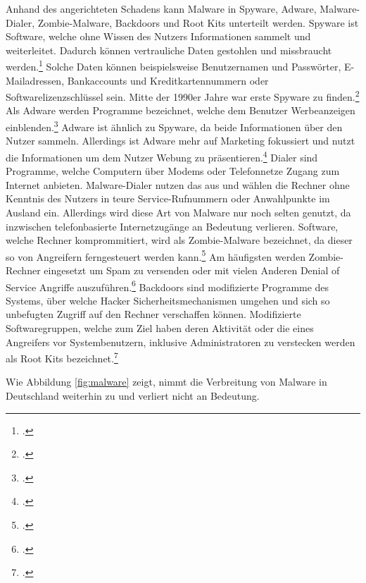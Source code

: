 Anhand des angerichteten Schadens kann Malware in Spyware, Adware, Malware-Dialer, Zombie-Malware,
Backdoors und Root Kits unterteilt werden. Spyware ist Software, welche ohne Wissen des Nutzers
Informationen sammelt und weiterleitet. Dadurch können vertrauliche Daten gestohlen und missbraucht
werden.\footcite[Vgl.][95\psq]{netzwerkDatensicherheit} Solche Daten können beispielsweise
Benutzernamen und Passwörter, E-Mailadressen, Bankaccounts und Kreditkartennummern oder
Softwarelizenzschlüssel sein. Mitte der 1990er Jahre war erste Spyware zu
finden.\footcite[Vgl.][16]{virusesMalware} Als Adware werden Programme bezeichnet, welche dem
Benutzer Werbeanzeigen einblenden.\footcite[Vgl.][96]{netzwerkDatensicherheit} Adware ist ähnlich
zu Spyware, da beide Informationen über den Nutzer sammeln. Allerdings ist Adware mehr auf
Marketing fokussiert und nutzt die Informationen um dem Nutzer Webung zu
präsentieren.\footcite[Vgl.][17]{virusesMalware} Dialer sind Programme, welche Computern über
Modems oder Telefonnetze Zugang zum Internet anbieten. Malware-Dialer nutzen das aus und wählen die
Rechner ohne Kenntnis des Nutzers in teure Service-Rufnummern oder Anwahlpunkte im Ausland ein.
Allerdings wird diese Art von Malware nur noch selten genutzt, da inzwischen
telefonbasierte Internetzugänge an Bedeutung verlieren. Software, welche Rechner komprommitiert, wird als
Zombie-Malware bezeichnet, da dieser so von Angreifern ferngesteuert werden
kann.\footcite[Vgl.][96]{netzwerkDatensicherheit} Am häufigsten werden Zombie-Rechner eingesetzt um
Spam zu versenden oder mit vielen Anderen Denial of Service Angriffe
auszuführen.\footcite[Vgl.][18]{virusesMalware} Backdoors sind modifizierte Programme des Systems,
über welche Hacker Sicherheitsmechanismen umgehen und sich so unbefugten Zugriff auf den Rechner
verschaffen können. Modifizierte Softwaregruppen, welche zum Ziel haben deren Aktivität oder die
eines Angreifers vor Systembenutzern, inklusive Administratoren zu verstecken werden als Root Kits
bezeichnet.\footcite[Vgl.][96]{netzwerkDatensicherheit}

Wie Abbildung \ref{fig:malware} zeigt, nimmt die Verbreitung von Malware in Deutschland weiterhin zu
und verliert nicht an Bedeutung.

